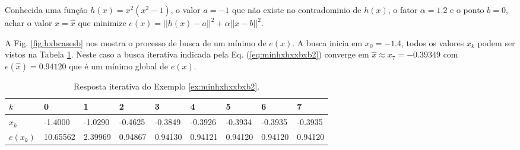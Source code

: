 \begin{example}\label{ex:minhxhxxbxb2}
Conhecida uma função $h(x)=x^2(x^2-1)$, o valor $a=-1$ que não existe no contradominio de $h(x)$,
o fator $\alpha=1.2$ e o ponto $b=0$,
achar o valor $x=\hat{x}$ que minimize $e(x)=||h(x)-a||^2+\alpha||x-b||^2$.
\end{example}
\begin{SolutionT}\label{sol:minhxhxxbxb2}
 A Fig. \ref{fig:hxbcasesb} nos mostra o processo de busca de um mínimo
 de $e(x)$. A busca inicia em $x_0=-1.4$,
 todos os valores $x_{k}$ podem ser vistos na 
Tabela \ref{tab:hxbcases2}. Neste caso a busca iterativa indicada pela Eq. (\ref{eq:minhxhxxbxb2}) converge
em $\hat{x}\approx x_7=-0.39349$ com $e(\hat{x})=0.94120$ que é um mínimo global de $e(x)$.

\end{SolutionT}

\begin{table}[!h]
\centering
\begin{tabular}{|l|l|l|l|l|l|l|l|l|}
\hline
$k$      & 0 & 1 & 2 & 3 & 4 & 5 & 6 & 7 \\ \hline
$x_k$    & -1.4000 & -1.0290 & -0.4625 & -0.3849 & -0.3926 & -0.3934 & -0.3935 & -0.3935 \\ \hline
$e(x_k)$ & 10.65562 &  2.39969 &  0.94867 &  0.94130 &  0.94121 &  0.94120 &  0.94120 &  0.94120 \\ \hline
\end{tabular}
\caption{Resposta iterativa do Exemplo \ref{ex:minhxhxxbxb2}.}
\label{tab:hxbcases2}
\end{table}


